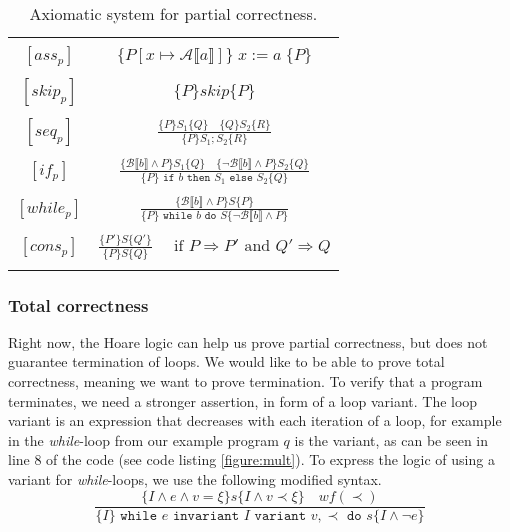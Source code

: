\begin{table}[h!]
\centering
\begin{tabular}{|c c|} 
 \hline
	& \\
 $[ass_p ]$ & $\{ P[x \mapsto \mathcal{A} \llbracket a \rrbracket ] \} \; x := a \; \{ P \}$ \\ 
	& \\
 $[skip_p ]$ & $\{ P \} skip \{ P \}$ \\ 
	& \\
 $[seq_p ]$ & 
		$\frac{\{ P \} S_1 \{Q \} \quad \{ Q\} S_2 \{ R \}}{\{ P \} S_1;S_2 \{ R \}}$ \\ 
	& \\
 $[if_p ]$ & 
		$\frac{ \{\mathcal{B} \llbracket b \rrbracket \land P \} S_1 \{ Q \} \quad 
           \{ \neg \mathcal{B} \llbracket b \rrbracket \land P\} S_2 \{ Q \} }
          {\{P\} \texttt{ if } b \texttt{ then } S_1 \texttt{ else } S_2 \{Q\}}$ \\
	& \\
 $[while_p ]$ & 
		$\frac{ \{\mathcal{B} \llbracket b \rrbracket \land P \} S \{ P \}}
          {\{P\} \texttt{ while } b \texttt{ do } S 
           \{\neg \mathcal{B} \llbracket b \rrbracket \land P\}}$ \\
	& \\
 $[cons_p ]$ & 
		$\frac{ \{P'\} S \{Q'\}}{\{P\} S \{Q\}} \quad 
     \text{ if } P \Rightarrow P' \text{ and } Q' \Rightarrow Q $ \\
	& \\
 \hline
\end{tabular}
\caption{Axiomatic system for partial correctness.}
\label{table:axiomatic}
\end{table}


\subsubsection{Total correctness}\label{sec:total-correctness}
Right now, the Hoare logic can help us prove partial correctness, but does not guarantee termination of loops. We would like to be able to prove total correctness, meaning we want to prove termination. To verify that a program terminates, we need a stronger assertion, in form of a loop variant.
The loop variant is an expression that decreases with each iteration of a loop, for example in the \textit{while}-loop from our example program $q$ is the variant, as can be seen in line 8 of the code (see code listing \cref{figure:mult}).
To express the logic of using a variant for \textit{while}-loops, we use the following modified syntax.
$$
  \frac{
    \{I \land e \land v = \xi \} s \{I \land v \prec \xi \} \quad wf(\prec)
  }{
    \{I\} \texttt{ while } e \texttt{ invariant } I 
          \texttt{ variant } v, \prec \texttt{ do } s \{I \land \neg e\}
  }
$$

